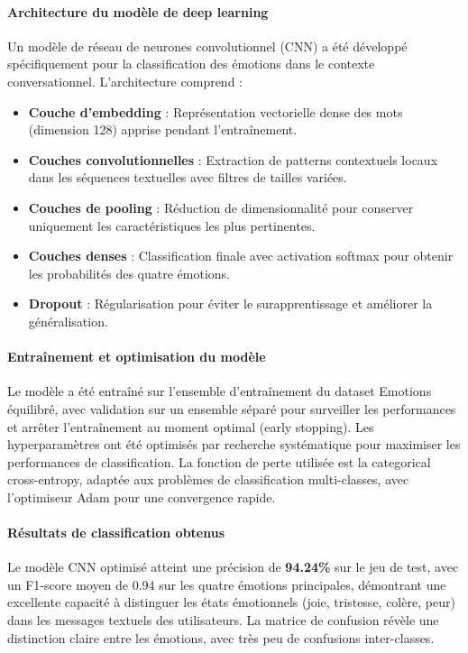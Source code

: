 \paragraph{Architecture du modèle de deep learning}
Un modèle de réseau de neurones convolutionnel (CNN) a été développé spécifiquement pour la classification des émotions dans le contexte conversationnel. L'architecture comprend :
\begin{itemize}
    \item \textbf{Couche d'embedding} : Représentation vectorielle dense des mots (dimension 128) apprise pendant l'entraînement.
    \item \textbf{Couches convolutionnelles} : Extraction de patterns contextuels locaux dans les séquences textuelles avec filtres de tailles variées.
    \item \textbf{Couches de pooling} : Réduction de dimensionnalité pour conserver uniquement les caractéristiques les plus pertinentes.
    \item \textbf{Couches denses} : Classification finale avec activation softmax pour obtenir les probabilités des quatre émotions.
    \item \textbf{Dropout} : Régularisation pour éviter le surapprentissage et améliorer la généralisation.
\end{itemize}

\paragraph{Entraînement et optimisation du modèle}
Le modèle a été entraîné sur l'ensemble d'entraînement du dataset Emotions équilibré, avec validation sur un ensemble séparé pour surveiller les performances et arrêter l'entraînement au moment optimal (early stopping). Les hyperparamètres ont été optimisés par recherche systématique pour maximiser les performances de classification. La fonction de perte utilisée est la categorical cross-entropy, adaptée aux problèmes de classification multi-classes, avec l'optimiseur Adam pour une convergence rapide.

\paragraph{Résultats de classification obtenus}
Le modèle CNN optimisé atteint une précision de \textbf{94.24\%} sur le jeu de test, avec un F1-score moyen de 0.94 sur les quatre émotions principales, démontrant une excellente capacité à distinguer les états émotionnels (joie, tristesse, colère, peur) dans les messages textuels des utilisateurs. La matrice de confusion révèle une distinction claire entre les émotions, avec très peu de confusions inter-classes.


